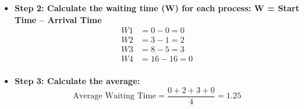 \begin{itemize}
\begin{itemize}
        \item \textbf{Step 2: Calculate the waiting time (W) for each process: W = Start Time – Arrival Time}
        \begin{align*}
            W1 &= 0 - 0 = 0 \\
            W2 &= 3 - 1 = 2 \\
            W3 &= 8 - 5 = 3 \\
            W4 &= 16 - 16 = 0 \\
        \end{align*}
        
        \item \textbf{Step 3: Calculate the average:}
        \[
            \text{Average Waiting Time} = \frac{0 + 2 + 3 + 0}{4} = 1.25
        \]
    \end{itemize}
\end{itemize}

